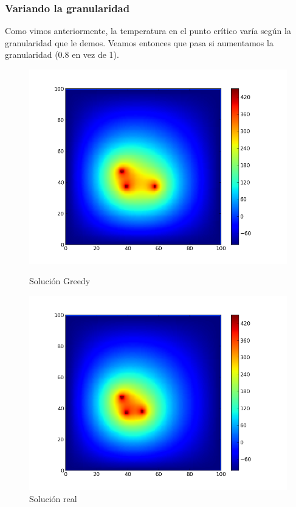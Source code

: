 \subsubsection{Variando la granularidad}

Como vimos anteriormente, la temperatura en el punto crítico varía según la granularidad que le demos. Veamos entonces que pasa si aumentamos la granularidad (0.8 en vez de 1).

\begin{figure}[htb]
\begin{center}
\includegraphics[scale=0.40]{imagenes/test6_g08_greedy.png} 
\caption{Solución Greedy} 

        \end{center}
\endminipage\hfill
{}
\begin{center}
\includegraphics[scale=0.40]{imagenes/test6_g08_random.png} 
\caption{Solución real} 
        \end{center}
\endminipage\hfill 
\end{figure}
